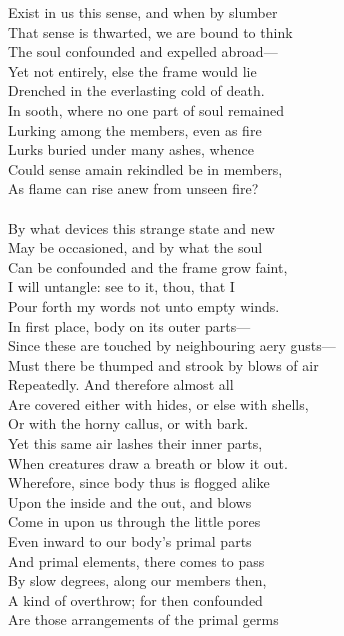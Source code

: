 Exist in us this sense, and when by slumber\\
That sense is thwarted, we are bound to think\\
The soul confounded and expelled abroad—\\
Yet not entirely, else the frame would lie\\
Drenched in the everlasting cold of death.\\
In sooth, where no one part of soul remained\\
Lurking among the members, even as fire\\
Lurks buried under many ashes, whence\\
Could sense amain rekindled be in members,\\
As flame can rise anew from unseen fire?\\
\\
By what devices this strange state and new\\
May be occasioned, and by what the soul\\
Can be confounded and the frame grow faint,\\
I will untangle: see to it, thou, that I\\
Pour forth my words not unto empty winds.\\
In first place, body on its outer parts—\\
Since these are touched by neighbouring aery gusts—\\
Must there be thumped and strook by blows of air\\
Repeatedly. And therefore almost all\\
Are covered either with hides, or else with shells,\\
Or with the horny callus, or with bark.\\
Yet this same air lashes their inner parts,\\
When creatures draw a breath or blow it out.\\
Wherefore, since body thus is flogged alike\\
Upon the inside and the out, and blows\\
Come in upon us through the little pores\\
Even inward to our body's primal parts\\
And primal elements, there comes to pass\\
By slow degrees, along our members then,\\
A kind of overthrow; for then confounded\\
Are those arrangements of the primal germs\\
